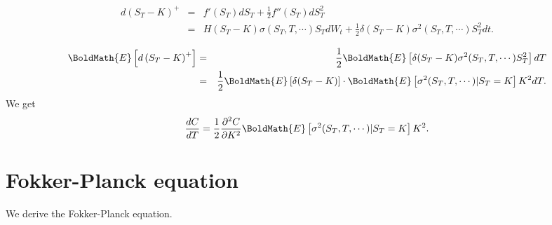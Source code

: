 \documentclass{article}
\begin{document}
\begin{eqnarray}
	d\left(S_T -K\right)^+ &=& f'(S_T)dS_T + \frac{1}{2} f''(S_T)dS_T^2 \\
	                       &=& H(S_T-K)\sigma(S_T, T, \cdots)S_T dW_t + \frac{1}{2} \delta (S_T-K) \sigma^2(S_T, T, \cdots)S_T^2 dt.
\end{eqnarray}

\begin{eqnarray}
	\BoldMath{E}\left[d\left(S_T -K\right)^+\right]
	  &=& \frac{1}{2} \BoldMath{E}\left[\delta (S_T-K) \sigma^2(S_T, T, \cdots)S_T^2 \right] dT \\
		&=& \frac{1}{2} \BoldMath{E}\left[\delta (S_T-K)\right] \cdot \BoldMath{E}\left[\sigma^2(S_T, T, \cdots)| S_T = K\right] K^2dT.
\end{eqnarray}
We get
\begin{equation}
	\frac{dC}{dT} = \frac{1}{2} \frac{\partial^2 C}{\partial K^2}\BoldMath{E}\left[\sigma^2(S_T, T, \cdots)| S_T = K\right]K^2.
\end{equation}

\appendix
\section{Fokker-Planck equation}
We derive the Fokker-Planck equation.


\end{document}
